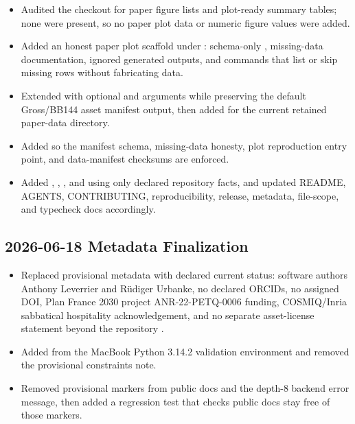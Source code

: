 \begin{itemize}
\item Audited the checkout for paper figure lists and plot-ready summary tables; none were present, so no paper plot data or numeric figure values were added.
\item Added an honest paper plot scaffold under \texttt{}: schema-only \texttt{}, missing-data documentation, ignored generated outputs, and \texttt{} commands that list or skip missing rows without fabricating data.
\item Extended \texttt{} with optional \texttt{} and \texttt{} arguments while preserving the default Gross/BB144 asset manifest output, then added \texttt{} for the current retained paper-data directory.
\item Added \texttt{} so the manifest schema, missing-data honesty, plot reproduction entry point, and data-manifest checksums are enforced.
\item Added \texttt{}, \texttt{}, \texttt{}, and \texttt{} using only declared repository facts, and updated README, AGENTS, CONTRIBUTING, reproducibility, release, metadata, file-scope, and typecheck docs accordingly.
\end{itemize}

\subsection*{2026-06-18 Metadata Finalization}

\begin{itemize}
\item Replaced provisional metadata with declared current status: software authors Anthony Leverrier and Rüdiger Urbanke, no declared ORCIDs, no assigned DOI, Plan France 2030 project ANR-22-PETQ-0006 funding, COSMIQ/Inria sabbatical hospitality acknowledgement, and no separate asset-license statement beyond the repository \texttt{}.
\item Added \texttt{} from the MacBook Python 3.14.2 validation environment and removed the provisional constraints note.
\item Removed provisional markers from public docs and the depth-8 backend error message, then added a regression test that checks public docs stay free of those markers.
\end{itemize}

